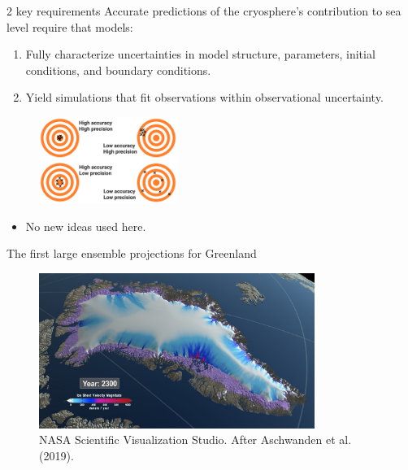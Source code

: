 \documentclass[hide notes,intlimits]{beamer}
\begin{document}
  {
}

\begin{frame}{2 key requirements}
Accurate predictions of the cryosphere's contribution to sea level require that models:
\begin{enumerate}
    \item Fully characterize uncertainties in model structure, parameters, initial conditions, and boundary conditions.
    \item Yield simulations that fit observations within observational uncertainty. 
\end{enumerate}
  \begin{figure}
    \includegraphics[width=0.4\textwidth]{difference-accuracy-and-precision}
  \end{figure}
  \begin{itemize}
    \item \alert{No new ideas used here.}
  \end{itemize}
\end{frame}

\begin{frame}{The first large ensemble projections for Greenland}
  \begin{figure}
    \includegraphics[width=0.8\textwidth]{Greenland_RCP_85_2008_2300_comp_4k.0293_print}
    \caption{NASA Scientific Visualization Studio. After Aschwanden et al. (2019).}
  \end{figure}
\end{frame}
\end{document}
